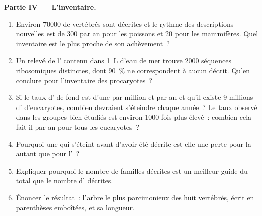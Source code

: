\begin{problem}
\medskip
\noindent\textbf{Partie IV --- L'inventaire.}
\begin{enumerate}[resume]
  \item Environ \num{70000}  de vertébrés sont décrites et le
        rythme des descriptions nouvelles est de \num{300} par an pour
        les poissons et \num{20} pour les mammifères. Quel inventaire
        est le plus proche de son achèvement~?
  \item Un relevé de l' contenu dans \qty{1}{L} d'eau de mer trouve
        \num{2000} séquences ribosomiques distinctes, dont
        \qty{90}{\%} ne correspondent à aucun  décrit. Qu'en
        conclure pour l'inventaire des procaryotes~?
  \item Si le taux d' de fond est d'une  par million et
        par an et qu'il existe \num{9} millions d'
        d'eucaryotes, combien devraient s'éteindre chaque année~? Le
        taux observé dans les groupes bien étudiés est environ
        \num{1000} fois plus élevé~: combien cela fait-il par an pour
        tous les eucaryotes~?
  \item Pourquoi une  qui s'éteint avant d'avoir été décrite
        est-elle une perte pour la  autant que pour
        l'~?
  \item Expliquer pourquoi le nombre de familles décrites est un
        meilleur guide du total que le nombre d' décrites.
  \item Énoncer le résultat~: l'arbre le plus parcimonieux des huit
        vertébrés, écrit en parenthèses emboîtées, et sa longueur.
\end{enumerate}
\end{problem}
